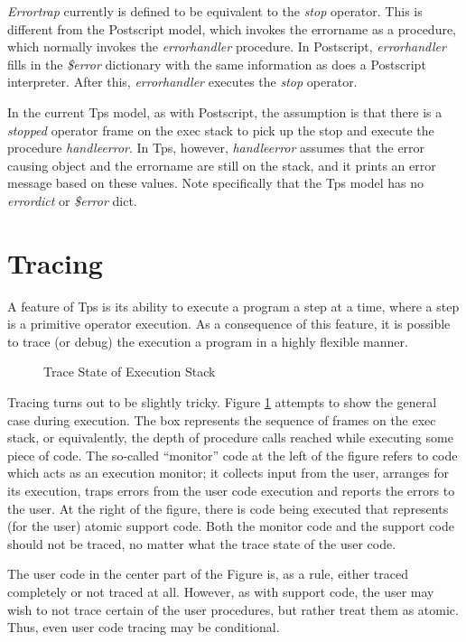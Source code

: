 {\em Errortrap} currently is defined to 
be equivalent to the {\em stop} operator.
This is different from the Postscript model, which invokes the errorname
as a procedure, which normally invokes the
{\em errorhandler} procedure.
In Postscript, {\em errorhandler} 
fills in the {\em \$error} dictionary
with the same information as does a Postscript interpreter.
After this, {\em errorhandler} executes the {\em stop} operator.

In the current Tps model,
as with Postscript, the assumption is that there is a {\em stopped}
operator frame on the exec stack to pick up the stop and execute
the procedure {\em handleerror}.
In Tps, however, {\em handleerror} assumes that the error causing object
and the errorname are still on the stack, and it prints an
error message based on these values.
Note specifically that the Tps model has no {\em errordict}
or {\em \$error} dict.

\section{Tracing}
\label{trace}
A feature of Tps is its ability to execute a program a step
at a time, where a step is a primitive operator execution.
As a consequence of this feature, it is possible to trace (or
debug) the execution a program in a highly flexible manner.

\begin{figure}[b]\centering
\centerline{}
\caption{Trace State of Execution Stack}
\label{traceexec}
\end{figure}

Tracing turns out to be slightly tricky.
Figure \ref{traceexec} attempts to show
the general case during execution.
The box represents the sequence of frames on the exec stack,
or equivalently, the depth of procedure calls
reached while executing some piece of code.
The so-called ``monitor'' code at the left of the figure
refers to code which acts as an execution monitor;
it collects input from the user, arranges for its execution,
traps errors from the user code execution and reports
the errors to the user.
At the right of the figure, there is code being executed
that represents (for the user) atomic support code.
Both the monitor code and the support code should not be traced,
no matter what the trace state of the user code.

The user code in the center part of the Figure is,
as a rule, either traced completely or not traced at all.
However, as with support code, the user may wish to not trace
certain of the user procedures, but rather treat them as atomic.
Thus, even user code tracing may be conditional.

